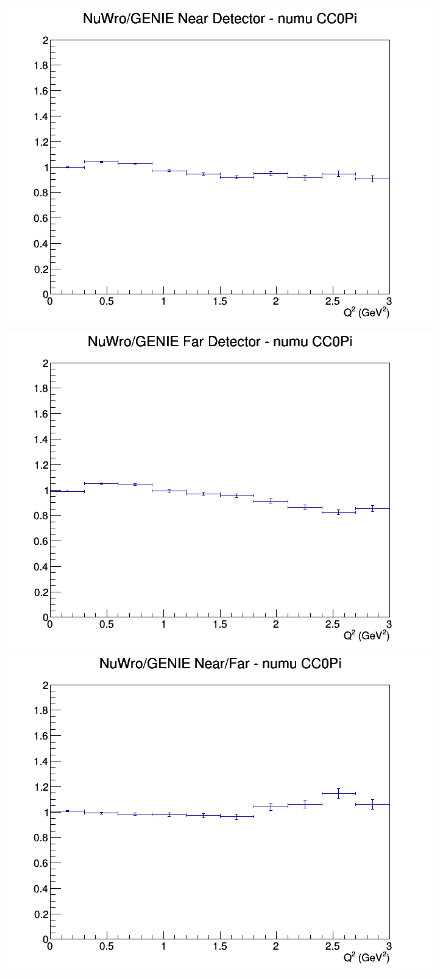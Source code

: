 \begin{figure}[h]
\endminipage
\newline
{}
\includegraphics[width=\linewidth]{eff_Q2/LAr/ratios/CC0Pi_NuWro_GENIE_numu_near_Q2.png}
\endminipage
{}
\includegraphics[width=\linewidth]{eff_Q2/LAr/ratios/CC0Pi_NuWro_GENIE_numu_far_Q2.png}
\endminipage
{}
\includegraphics[width=\linewidth]{eff_Q2/LAr/ratios/CC0Pi_NuWro_GENIE_numu_NF_Q2.png}
\endminipage
\newline
\end{figure}
\clearpage
